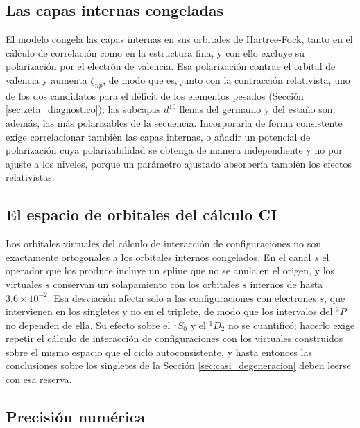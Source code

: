 \subsection{Las capas internas congeladas}
\label{sec:capas_congeladas}

El modelo congela las capas internas en sus orbitales de Hartree-Fock, tanto en el cálculo de correlación como en la estructura fina, y con ello excluye su polarización por el electrón de valencia. Esa polarización contrae el orbital de valencia y aumenta $\zeta_{np}$, de modo que es, junto con la contracción relativista, uno de los dos candidatos para el déficit de los elementos pesados (Sección \ref{sec:zeta_diagnostico}); las subcapas $d^{10}$ llenas del germanio y del estaño son, además, las más polarizables de la secuencia. Incorporarla de forma consistente exige correlacionar también las capas internas, o añadir un potencial de polarización cuya polarizabilidad se obtenga de manera independiente y no por ajuste a los niveles, porque un parámetro ajustado absorbería también los efectos relativistas.

\subsection{El espacio de orbitales del cálculo CI}
\label{sec:espacio_ci}

Los orbitales virtuales del cálculo de interacción de configuraciones no son exactamente ortogonales a los orbitales internos congelados. En el canal $s$ el operador que los produce incluye un spline que no se anula en el origen, y los virtuales $s$ conservan un solapamiento con los orbitales $s$ internos de hasta $3.6\times10^{-2}$. Esa desviación afecta solo a las configuraciones con electrones $s$, que intervienen en los singletes y no en el triplete, de modo que los intervalos del $^3P$ no dependen de ella. Su efecto sobre el $^1S_0$ y el $^1D_2$ no se cuantificó; hacerlo exige repetir el cálculo de interacción de configuraciones con los virtuales construidos sobre el mismo espacio que el ciclo autoconsistente, y hasta entonces las conclusiones sobre los singletes de la Sección \ref{sec:casi_degeneracion} deben leerse con esa reserva.

\subsection{Precisión numérica}

